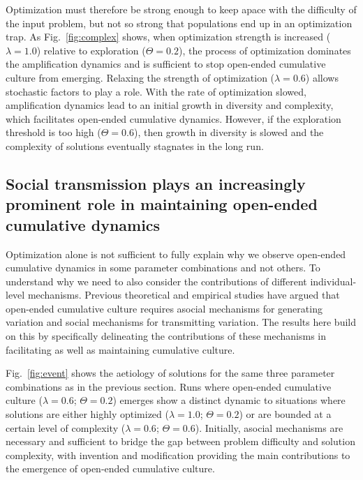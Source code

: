 \documentclass{article}
\begin{document}
Optimization must therefore be strong enough to keep apace with the difficulty of the input problem, but not so strong that populations end up in an optimization trap. As Fig.~\ref{fig:complex} shows, when optimization strength is increased ($\lambda=1.0$) relative to exploration ($\Theta=0.2$), the process of optimization dominates the amplification dynamics and is sufficient to stop open-ended cumulative culture from emerging. Relaxing the strength of optimization ($\lambda=0.6$) allows stochastic factors to play a role. With the rate of optimization slowed, amplification dynamics lead to an initial growth in diversity and complexity, which facilitates open-ended cumulative dynamics. However, if the exploration threshold is too high ($\Theta=0.6$), then growth in diversity is slowed and the complexity of solutions eventually stagnates in the long run.

\subsection{Social transmission plays an increasingly prominent role in maintaining open-ended cumulative dynamics}
Optimization alone is not sufficient to fully explain why we observe open-ended cumulative dynamics in some parameter combinations and not others. To understand why we need to also consider the contributions of different individual-level mechanisms. Previous theoretical and empirical studies have argued that open-ended cumulative culture requires asocial mechanisms for generating variation and social mechanisms for transmitting variation. The results here build on this by specifically delineating the contributions of these mechanisms in facilitating as well as maintaining cumulative culture.

Fig.~\ref{fig:event} shows the aetiology of solutions for the same three parameter combinations as in the previous section. Runs where open-ended cumulative culture ($\lambda=0.6$; $\Theta=0.2$) emerges show a distinct dynamic to situations where solutions are either highly optimized ($\lambda=1.0$; $\Theta=0.2$) or are bounded at a certain level of complexity ($\lambda=0.6$; $\Theta=0.6$). Initially, asocial mechanisms are necessary and sufficient to bridge the gap between problem difficulty and solution complexity, with invention and modification providing the main contributions to the emergence of open-ended cumulative culture.
\end{document}
